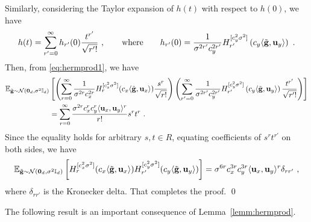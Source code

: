 Similarly, considering the Taylor expansion of $h(t)$ with respect to $h(0)$, we have 
\begin{align}
h(t) = \sum_{r'=0}^{\infty} h_{r'}(0) \frac{t^{r'}}{\sqrt{r'!}}~, \qquad \text{where} \qquad h_{r'}(0) 
= \frac{1}{\sigma^{2r'} c_y^{2r'}} H^{[c_y^2\sigma^2]}_{r'} \left( c_y \langle \tilde{\mathbf{g}}, \mathbf{u}_y \rangle \right)~.
\end{align}
Then, from \eqref{eq:hermprod1}, we have 
\begin{align*}
\mathbb{E}_{\tilde{\mathbf{g}} \sim {\cal N}(\bm{0}_d,\sigma^2 \mathbb{I}_d)}&\left[ \left( \sum_{r=0}^{\infty} \frac{1}{\sigma^{2r} c_x^{2r}} H^{[c_x^2 \sigma^2]}_r( c_x \langle \tilde{\mathbf{g}}, \mathbf{u}_x\rangle) \frac{s^r}{\sqrt{r!}} \right)  \left( \sum_{r'=0}^{\infty} \frac{1}{\sigma^{2r'} c_y^{2r'}} H^{[c_y^2 \sigma^2]}_{r'}\left( c_y \langle \tilde{\mathbf{g}}, \mathbf{u}_y \rangle \right) \frac{t^{r'}}{\sqrt{r'!}} \right) \right]\\
&=  \sum_{r=0}^{\infty} \frac{\sigma^{2r} c_x^r c_y^r \langle \mathbf{u}_x, \mathbf{u}_y \rangle^r}{r!} s^r t^r~.
\end{align*}
Since the equality holds for arbitrary $s,t \in R$, equating coefficients of  $s^r t^{r'}$ on both sides, we have 
\begin{align}
\mathbb{E}_{\tilde{\mathbf{g}} \sim {\cal N}(\bm{0}_d,\sigma^2 \mathbb{I}_d)}\left[ H_r^{[c_x^2 \sigma^2]}(c_x \langle \tilde{\mathbf{g}}, \mathbf{u}_x\rangle) H_{r'}^{[c_y^2 \sigma^2]}(c_y \langle \tilde{\mathbf{g}}, \mathbf{u}_y \rangle) \right] = \sigma^{6r} c_x^{3r} c_y^{3r} \langle \mathbf{u}_x, \mathbf{u}_y \rangle^r \delta_{rr'}~,
\end{align}
where $\delta_{rr'}$ is the Kronecker delta. That completes the proof. \qed 

The following result is an important consequence of Lemma~\ref{lemm:hermprod}.

